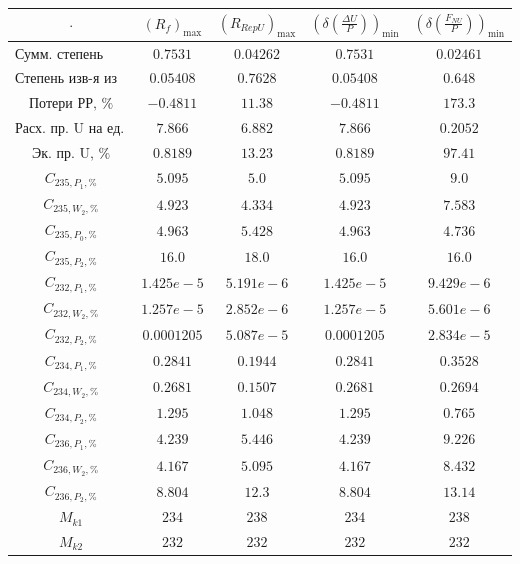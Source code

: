 \begin{table}
    \begin{tabular}{ccccc}
        $\cdot$ & $(R_f)_\text{max}$ & $(R_{RepU})_\text{max}$ & $(\delta(\frac{\Delta U}{P}))_\text{min}$ & $(\delta(\frac{F_{NU}}{P}))_\text{min}$\\ \hline
        $\text{Сумм. степень изв-я}$ & $0.7531$ & $0.04262$ & $0.7531$ & $0.02461$\\ \hline
        $\text{Степень изв-я из рег-та}$ & $0.05408$ & $0.7628$ & $0.05408$ & $0.648$\\ \hline
        $\text{Потери РР, \%}$ & $-0.4811$ & $11.38$ & $-0.4811$ & $173.3$\\ \hline
        $\text{Расх. пр. U на ед. прод.}$ & $7.866$ & $6.882$ & $7.866$ & $0.2052$\\ \hline
        $\text{Эк. пр. U, \%}$ & $0.8189$ & $13.23$ & $0.8189$ & $97.41$\\ \hline
        $C_{235,P_1, \%}$ & $5.095$ & $5.0$ & $5.095$ & $9.0$\\ \hline
        $C_{235,W_2, \%}$ & $4.923$ & $4.334$ & $4.923$ & $7.583$\\ \hline
        $C_{235,P_0, \%}$ & $4.963$ & $5.428$ & $4.963$ & $4.736$\\ \hline
        $C_{235,P_2, \%}$ & $16.0$ & $18.0$ & $16.0$ & $16.0$\\ \hline
        $C_{232,P_1, \%}$ & $1.425e-5$ & $5.191e-6$ & $1.425e-5$ & $9.429e-6$\\ \hline
        $C_{232,W_2, \%}$ & $1.257e-5$ & $2.852e-6$ & $1.257e-5$ & $5.601e-6$\\ \hline
        $C_{232,P_2, \%}$ & $0.0001205$ & $5.087e-5$ & $0.0001205$ & $2.834e-5$\\ \hline
        $C_{234,P_1, \%}$ & $0.2841$ & $0.1944$ & $0.2841$ & $0.3528$\\ \hline
        $C_{234,W_2, \%}$ & $0.2681$ & $0.1507$ & $0.2681$ & $0.2694$\\ \hline
        $C_{234,P_2, \%}$ & $1.295$ & $1.048$ & $1.295$ & $0.765$\\ \hline
        $C_{236,P_1, \%}$ & $4.239$ & $5.446$ & $4.239$ & $9.226$\\ \hline
        $C_{236,W_2, \%}$ & $4.167$ & $5.095$ & $4.167$ & $8.432$\\ \hline
        $C_{236,P_2, \%}$ & $8.804$ & $12.3$ & $8.804$ & $13.14$\\ \hline
        $M_{k1}$ & $234$ & $238$ & $234$ & $238$\\ \hline
        $M_{k2}$ & $232$ & $232$ & $232$ & $232$\\ \hline

\end{tabular}
\end{table}
